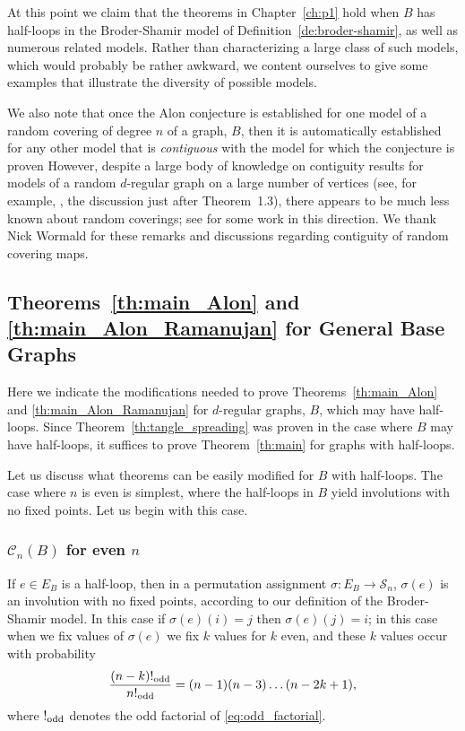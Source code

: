 \documentclass{memo-l}
\newcommand{\oddf}{!_{\rm odd}}
\theoremstyle{plain}
\theoremstyle{definition}
\numberwithin{section}{chapter}
\numberwithin{equation}{chapter}
\newcommand{\from}{\colon}
\theoremstyle{plain}
\theoremstyle{definition}
\newcommand\cC{\mathcal{C}}
\newcommand\cS{\mathcal{S}}
\begin{document}
At this point we claim that the theorems in Chapter~\ref{ch:p1} hold
when $B$ has half-loops in the Broder-Shamir model of
Definition~\ref{de:broder-shamir}, as well as numerous related 
models.  Rather than characterizing a large class of such models, 
which would probably be rather awkward, we content ourselves to
give some examples that illustrate the diversity of possible models.

We also note that once the Alon conjecture is established for one
model of a random covering of degree $n$ of a graph, $B$, then it
is automatically established for any other model that is {\em contiguous}
with the model for which the conjecture is proven
However, despite a large body of knowledge on contiguity results for
models of a random $d$-regular graph on a large number of vertices
(see, for example, \cite{friedman_alon}, 
the discussion just after Theorem~1.3),
there appears to be much less known about random coverings;
see \cite{greenhill_lifts} for some work in this direction.
We thank Nick Wormald for these remarks and
discussions regarding contiguity of
random covering maps.


\subsection{Theorems~\ref{th:main_Alon} and \ref{th:main_Alon_Ramanujan}
for General Base Graphs}
\label{sb:general_base_graphs}

Here we indicate the modifications needed to prove
Theorems~\ref{th:main_Alon} and \ref{th:main_Alon_Ramanujan} for
$d$-regular graphs, $B$, which may have half-loops.
Since Theorem~\ref{th:tangle_spreading} was proven in the case where
$B$ may have half-loops, it suffices to
prove Theorem~\ref{th:main} for graphs with half-loops.

Let us discuss what theorems can be easily modified for $B$ with
half-loops.  The case where $n$ is even is simplest, where the half-loops
in $B$ yield involutions with no fixed points.  Let us begin with this case.

\subsubsection{$\cC_n(B)$ for even $n$}

If $e\in E_B$ is a half-loop, then in a permutation assignment
$\sigma\from E_B\to\cS_n$, $\sigma(e)$ is an involution with no
fixed points, according to our definition of the Broder-Shamir model.
In this case if $\sigma(e)(i)=j$ then $\sigma(e)(j)=i$; in this case
when we fix values of $\sigma(e)$ we fix $k$ values for $k$ even, and
these $k$ values occur with probability
$$
\frac{(n-k)\oddf}{n\oddf} = (n-1)(n-3)\ldots(n-2k+1),
$$
where $\oddf$ denotes the odd factorial
of \eqref{eq:odd_factorial}.
\end{document}

